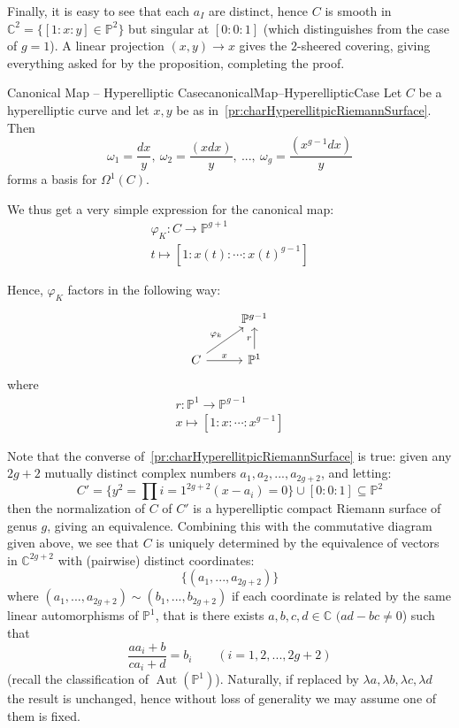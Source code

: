 \documentclass{book}
\newcommand{\C}{{\mathbb{C}}}
\renewcommand{\P}{{\mathbb{P}}}
\newcommand{\Aut}{{\operatorname{Aut}}}
\newcommand{\sse}{\subseteq}
\let\temp\phi
\let\phi\varphi
\let\varphi\temp
\begin{document}
\begin{Proof}
    Finally, it is easy to see that each $a_I$ are distinct, hence $C$ is smooth in $\C^2 = \{[1:x:y] \in
    \P^2\}$ but singular at $[0:0:1]$ (which distinguishes from the case of $g=1$). A linear projection $(x,y)
    \to x$ gives the $2$-sheered covering, giving everything asked for by the proposition, completing the
    proof.
\end{Proof}


\begin{prop}{Canonical Map -- Hyperelliptic Case}{canonicalMap--HyperellipticCase}
  Let $C$ be a hyperelliptic curve and let $x,y$ be as in~\cref{pr:charHyperellitpicRiemannSurface}. Then
  \[
    \omega_1 = \frac{dx}{y},\ \omega_2 = \frac{(xdx)}{y},\ ...,\ \omega_g = \frac{(x^{g-1}dx)}{y}
  \]
  forms a basis for $\Omega^1(C)$.
\end{prop}

\begin{Proof}
  \cite[p.142]{a.griffithsIntroductionAlgebraicCurves}
\end{Proof}

We thus get a very simple expression for the canonical map:
\begin{gather*}
  \phi_K: C \to \P^{g+1}\\
  t \mapsto [1: x(t): \cdots : x(t)^{g-1}]
\end{gather*}

Hence, $\phi_K$ factors in the following way:
\[
\begin{tikzcd}
                                      & \P^{g-1}            \\
C \arrow[r, "x"] \arrow[ru, "\phi_k"] & \P^1 \arrow[u, "r"]
\end{tikzcd}
\]
where
\begin{gather*}
  r: \P^1 \to \P^{g-1}\\
  x \mapsto [1:x:\cdots: x^{g-1}]
\end{gather*}

Note that the converse of~\cref{pr:charHyperellitpicRiemannSurface} is true: given any $2g+2$ mutually distinct complex numbers $a_1, a_2, ...,
a_{2g+2}$, and letting:
\[
  C' = \{y^2 = \prod{i=1}^{2g+2}(x-a_i)= 0 \}\cup [0:0:1] \sse \P^2
\]
then the normalization of $C$ of $C'$ is a hyperelliptic compact Riemann surface of genus $g$, giving an
equivalence. Combining this with the commutative diagram given above, we see that $C$ is uniquely determined
by the equivalence of vectors in $\C^{2g+2}$ with (pairwise) distinct coordinates:
\[
  \{(a_1, ..., a_{2g+2})\}
\]
where $(a_1, ..., a_{2g+2})\sim (b_1, ..., b_{2g+2})$ if each coordinate is related by the same linear automorphisms
of $\P^1$, that is there exists $a,b,c,d \in \C$ $(ad-bc \ne 0$) such that
\[
  \frac{aa_i + b}{ca_i+d} = b_i \qquad (i = 1,2,..., 2g+2)
\]
(recall the classification of $\Aut(\P^1)$). Naturally, if replaced by $\lambda a,\lambda b,\lambda c,\lambda
d$ the result is unchanged, hence without loss of generality we may assume one of them is fixed.
\end{document}
